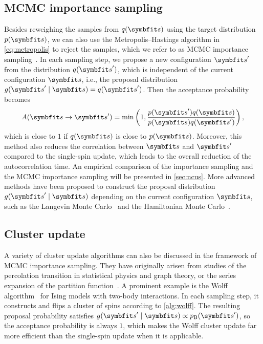 \subsection{MCMC importance sampling}

Besides reweighing the samples from $q(\vs)$ using the target distribution $p(\vs)$, we can also use the Metropolis--Hastings algorithm in \cref{eq:metropolis} to reject the samples, which we refer to as MCMC importance sampling~\cite{liesenfeld2008improving, schuster2020markov}. In each sampling step, we propose a new configuration $\vs'$ from the distribution $q(\vs')$, which is independent of the current configuration $\vs$, i.e., the proposal distribution $g(\vs' \mid \vs) = q(\vs')$. Then the acceptance probability becomes
\begin{equation}
A(\vs \to \vs') = \min\left( 1, \frac{p(\vs') q(\vs)}{p(\vs) q(\vs')} \right),
\label{eq:mcmc-importance}
\end{equation}
which is close to $1$ if $q(\vs)$ is close to $p(\vs)$. Moreover, this method also reduces the correlation between $\vs$ and $\vs'$ compared to the single-spin update, which leads to the overall reduction of the autocorrelation time. An empirical comparison of the importance sampling and the MCMC importance sampling will be presented in \cref{sec:ncus}. More advanced methods have been proposed to construct the proposal distribution $g(\vs' \mid \vs)$ depending on the current configuration $\vs$, such as the Langevin Monte Carlo~\cite{rossky1978brownian} and the Hamiltonian Monte Carlo~\cite{duane1987hybrid}.

\subsection{Cluster update}
\label{sec:cluster-update}

A variety of cluster update algorithms can also be discussed in the framework of MCMC importance sampling. They have originally arisen from studies of the percolation transition in statistical physics and graph theory, or the series expansion of the partition function~\cite{fortuin1972random, leung1991percolation, evertz1993cluster}. A prominent example is the Wolff algorithm~\cite{wolff1989collective} for Ising models with two-body interactions. In each sampling step, it constructs and flips a cluster of spins according to \cref{alg:wolff}. The resulting proposal probability satisfies $g(\vs' \mid \vs) \propto p_\text{B}(\vs')$, so the acceptance probability is always $1$, which makes the Wolff cluster update far more efficient than the single-spin update when it is applicable.

